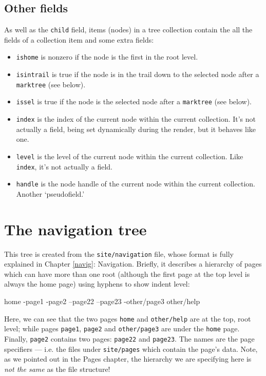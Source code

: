 \subsection{Other fields}
As well as the \texttt{child} field, items (nodes) in a tree collection
contain the all the fields of a collection item and some extra fields:
\begin{itemize}
\item \texttt{ishome} is nonzero if the node is the first in the root level.
\item \texttt{isintrail} is true if the node is in the trail down to the selected node after a \texttt{marktree} (see below).
\item \texttt{issel} is true if the node is the selected node after a \texttt{marktree} (see below).
\item \texttt{index} is the index of the current node within the current collection. It's
not actually a field, being set dynamically during the render, but it behaves
like one.
\item \texttt{level} is the level of the current node within the current collection. Like \texttt{index}, it's
not actually a field.
\item \texttt{handle} is the node handle of the current node within the current collection. Another `pseudofield.'
\end{itemize}

\section{The navigation tree}
This tree is created from the \texttt{site/navigation} file, whose format is
fully explained in Chapter \ref{navig}: Navigation. Briefly, it describes a
hierarchy of pages which can have more than one root (although the first page
at the top level is always the home page) using hyphens to show indent level:
\begin{MyVerbatim}
home
-page1
-page2
--page22
--page23
-other/page3
other/help
\end{MyVerbatim}
Here, we can see that the two pages \texttt{home} and \texttt{other/help} are
at the top, root level; while pages \texttt{page1}, \texttt{page2} and
\texttt{other/page3} are under the \texttt{home} page. Finally, \texttt{page2}
contains two pages: \texttt{page22} and \texttt{page23}. The names are the
page specifiers --- i.e. the files under \texttt{site/pages} which contain the
page's data. Note, as we pointed out in the Pages chapter, the hierarchy we
are specifying here is \emph{not the same} as the file structure!

